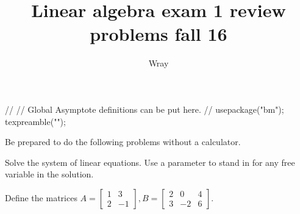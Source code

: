 \documentclass[12pt]{exam}
\title{Linear algebra exam 1 review problems fall 16}
\author{Wray}
\begin{document}
\begin{asydef}
//
// Global Asymptote definitions can be put here.
//
usepackage("bm");
texpreamble("\def\V#1{\bm{#1}}");
\end{asydef}

\bigskip
\bigskip

Be prepared to do the following problems without a calculator.

\begin{questions}

\question
Solve the system of linear equations.  Use a parameter to stand in for any free variable in the solution.

\question
Define the matrices $A = \left[ \begin{array}{cc}
1 & 3 \\ 
2 & -1 
\end{array} \right],
B = 
\left[ \begin{array}{ccc}
2 & 0 & 4 \\
3 & -2 & 6
\end{array} \right]$.
\begin{parts}

\end{parts}
\end{questions}
\end{document}
